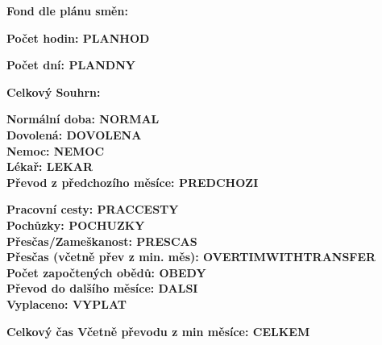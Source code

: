 \documentclass[10pt, a4paper]{article}%
\begin{document}
    
\begin{flushleft}%
    \Large\textbf{Fond dle plánu směn:\\}
    \vspace{0.3cm}

    \begin{minipage}{0.49\textwidth}
        \normalsize\textbf{Počet hodin: PLANHOD}\\
    \end{minipage}
    \hfill
    \begin{minipage}{0.49\textwidth}
        \normalsize\textbf{Počet dní: PLANDNY}\\

    \end{minipage}

    \vspace{0.3cm}
    \Large\textbf{Celkový Souhrn:\\}
    \vspace{0.3cm}

    \begin{minipage}{0.49\textwidth}
        \normalsize\textbf{Normální doba: NORMAL}\\
        \normalsize\textbf{Dovolená: DOVOLENA}\\
        \normalsize\textbf{Nemoc: NEMOC}\\
        \normalsize\textbf{Lékař: LEKAR}\\
        \normalsize\textbf{Převod z předchozího měsíce: PREDCHOZI}
    \end{minipage}
    \hfill
    \begin{minipage}{0.49\textwidth}
        \normalsize\textbf{Pracovní cesty: PRACCESTY}\\
        \normalsize\textbf{Pochůzky: POCHUZKY}\\
        \normalsize\textbf{Přesčas/Zameškanost: PRESCAS}\\
        \normalsize\textbf{Přesčas (včetně přev z min. měs): OVERTIMWITHTRANSFER}\\
        \normalsize\textbf{Počet započtených obědů: OBEDY}\\
        \normalsize\textbf{Převod do dalšího měsíce: DALSI}\\
        \normalsize\textbf{Vyplaceno: VYPLAT}\\
    \end{minipage}

    \vspace{0.3cm}

    \Large\textbf{Celkový čas Včetně převodu z min měsíce: CELKEM}\\ %
    

\end{flushleft}
\end{document}
